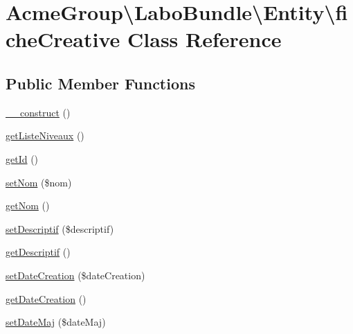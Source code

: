 \hypertarget{class_acme_group_1_1_labo_bundle_1_1_entity_1_1fiche_creative}{\section{Acme\+Group\textbackslash{}Labo\+Bundle\textbackslash{}Entity\textbackslash{}fiche\+Creative Class Reference}
\label{class_acme_group_1_1_labo_bundle_1_1_entity_1_1fiche_creative}
}
\subsection*{Public Member Functions}
\begin{DoxyCompactItemize}
\item 
\hyperlink{class_acme_group_1_1_labo_bundle_1_1_entity_1_1fiche_creative_aa88344c65da2a48abcf156ee0d95ecb7}{\+\_\+\+\_\+construct} ()
\item 
\hyperlink{class_acme_group_1_1_labo_bundle_1_1_entity_1_1fiche_creative_a158ad86febc53909902e4054288bfc19}{get\+Liste\+Niveaux} ()
\item 
\hyperlink{class_acme_group_1_1_labo_bundle_1_1_entity_1_1fiche_creative_a643ec394d74c98460425ad6d28c09c22}{get\+Id} ()
\item 
\hyperlink{class_acme_group_1_1_labo_bundle_1_1_entity_1_1fiche_creative_a510003232e6c3c5ebbd6b69a474cb2b1}{set\+Nom} (\$nom)
\item 
\hyperlink{class_acme_group_1_1_labo_bundle_1_1_entity_1_1fiche_creative_a1a50277f4f61ec33fb9ca1b746b5aa58}{get\+Nom} ()
\item 
\hyperlink{class_acme_group_1_1_labo_bundle_1_1_entity_1_1fiche_creative_ad6d8d23347d2a4c80b83354fd31fd53e}{set\+Descriptif} (\$descriptif)
\item 
\hyperlink{class_acme_group_1_1_labo_bundle_1_1_entity_1_1fiche_creative_a73ed6ff064731224156f67d6c4395bdb}{get\+Descriptif} ()
\item 
\hyperlink{class_acme_group_1_1_labo_bundle_1_1_entity_1_1fiche_creative_aead1fb61d1b26fef150d12649873679b}{set\+Date\+Creation} (\$date\+Creation)
\item 
\hyperlink{class_acme_group_1_1_labo_bundle_1_1_entity_1_1fiche_creative_a8e17a0bc7e43b40439aa821d93152fc6}{get\+Date\+Creation} ()
\item 
\hyperlink{class_acme_group_1_1_labo_bundle_1_1_entity_1_1fiche_creative_a5c191d0977c1b1d6ebfb8389676407fb}{set\+Date\+Maj} (\$date\+Maj)

\end{DoxyCompactItemize}
